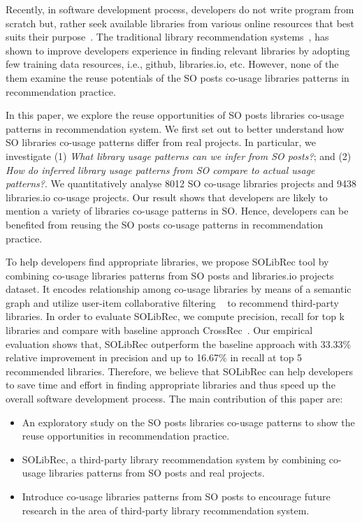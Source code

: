 \documentclass[paper]{ieice}
\newcommand{\PSOne}{\textit{What library usage patterns can we infer from SO posts?}}
\newcommand{\PSTwo}{\textit{How do inferred library usage patterns from SO compare to actual usage patterns?}}
\begin{document}
Recently, in software development process, developers do not write program from scratch but, rather seek available libraries from various online resources that best suits their purpose~\cite{nguyen2020crossrec}. The traditional library recommendation systems~\cite{nguyen2020crossrec, saied2018improving, thung2013automated, ouni2017search}, has shown to improve developers experience in finding relevant libraries by adopting few training data resources, i.e., github, libraries.io, etc. However, none of the them examine the reuse potentials of the SO posts co-usage libraries patterns in recommendation practice. 

In this paper, we explore the reuse opportunities of SO posts libraries co-usage patterns in recommendation system. We first set out to better understand how SO libraries co-usage patterns differ from real projects. In particular, we investigate (1) \PSOne; and (2) \PSTwo. We quantitatively analyse 8012 SO co-usage libraries projects and 9438 libraries.io co-usage projects. Our result shows that developers are likely to mention a variety of libraries co-usage patterns in SO. Hence, developers can be benefited from reusing the SO posts co-usage patterns in recommendation practice. 

To help developers find appropriate libraries, we propose SOLibRec tool by combining co-usage libraries patterns from SO posts and libraries.io projects dataset. It encodes relationship among co-usage libraries by means of a semantic graph and utilize user-item collaborative filtering ~\cite{schafer2007collaborative} to recommend third-party libraries. In order to  evaluate SOLibRec, we compute precision, recall for top k libraries and compare with baseline approach CrossRec~\cite{nguyen2020crossrec}. Our empirical evaluation shows that, SOLibRec outperform the baseline approach with 33.33\% relative improvement in precision and up to 16.67\% in recall at top 5 recommended libraries. Therefore, we believe that SOLibRec can help developers to save time and effort in finding appropriate libraries and thus speed up the overall software development process.
The main contribution of this paper are:
\begin{itemize}
    \item An exploratory study on the SO posts libraries co-usage patterns to show the reuse opportunities in recommendation practice.
    \item SOLibRec, a third-party library recommendation system by combining co-usage libraries patterns from SO posts and real projects.
    \item Introduce co-usage libraries patterns from SO posts to encourage future research in the area of third-party library recommendation system.
\end{itemize}
\end{document}
